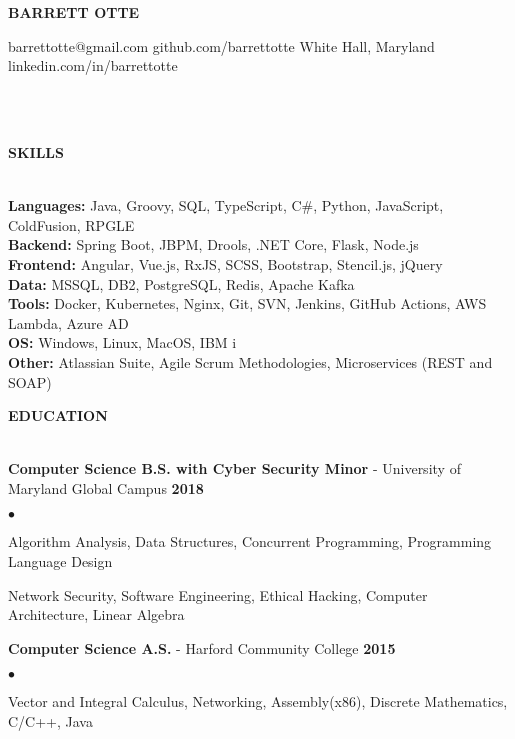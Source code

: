 \documentclass{article}
\newcommand{\lineunder}{
	\vspace*{-4pt}\\ 
	\hspace*{-18pt}\hrulefill \\
}
\newcommand{\header}[1]{
	{\hspace*{-15pt}\vspace*{6pt}\textsc{#1}}\vspace*{-6pt}\lineunder
}
\newcommand{\contact}[5]{
	\begin{center}
		{\Large \textbf \scshape \bfseries{#1}}
	\end{center}
	\small{#2} \hfill \small{#3} \break
	\small{#4} \hfill \small{#5} \break
	\vspace*{-6pt}
	\lineunder
	\vspace*{-6pt}
}
\newcommand{\education}[3]{
	\textbf{#1} - #2 \hfill \textbf{#3} \vspace*{3pt}
}
\newenvironment{resumelist}{
	\vspace*{2pt}
	\begin{list}
		{\small$\bullet$}{\topsep 0pt \itemsep -2pt}}{\vspace*{4pt}
	\end{list}
}
\newcommand{\resumeheader}[1]{
	\vspace*{14pt}
	\header{\textbf{#1}}
    \vspace*{5pt}
}
\begin{document}
	\normalsize
	\smallskip
	\vspace*{-44pt}

	\contact
		{BARRETT OTTE}
		{barrettotte@gmail.com}
		{github.com/barrettotte}
		{White Hall, Maryland}
		{linkedin.com/in/barrettotte}

	\resumeheader{SKILLS}
		\textbf{Languages:}
			Java, Groovy, SQL, TypeScript, C\#, Python, JavaScript, ColdFusion, RPGLE\\
			\vspace*{5pt}
        \textbf{Backend:}
			Spring Boot, JBPM, Drools, .NET Core, Flask, Node.js\\
			\vspace*{5pt}
		\textbf{Frontend:}
			Angular, Vue.js, RxJS, SCSS, Bootstrap, Stencil.js, jQuery\\
			\vspace*{5pt}
        \textbf{Data:}
			MSSQL, DB2, PostgreSQL, Redis, Apache Kafka\\
			\vspace*{5pt}
		\textbf{Tools:}
			Docker, Kubernetes, Nginx, Git, SVN, Jenkins, GitHub Actions, AWS Lambda, Azure AD\\
			\vspace*{5pt}
        \textbf{OS:}
            Windows, Linux, MacOS, IBM i\\
			\vspace*{5pt}
		\textbf{Other:}
			Atlassian Suite, Agile Scrum Methodologies, Microservices (REST and SOAP)

	\resumeheader{EDUCATION}
		\education 
			{Computer Science B.S. with Cyber Security Minor}{University of Maryland Global Campus} 
			{2018}
            \begin{resumelist}
                \item Algorithm Analysis, Data Structures, Concurrent Programming, Programming Language Design
                \item Network Security, Software Engineering, Ethical Hacking, Computer Architecture, Linear Algebra
            \end{resumelist}
            \vspace*{6pt}
		\education
			{Computer Science A.S.}{Harford Community College}
			{2015}
            \begin{resumelist}
                \item Vector and Integral Calculus, Networking, Assembly(x86), Discrete Mathematics, C/C++, Java
            \end{resumelist}
\end{document}
